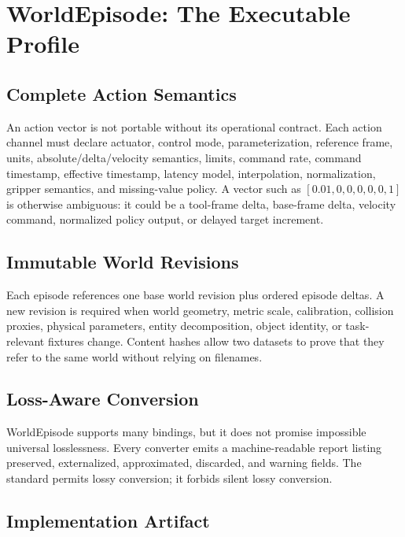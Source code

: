 \section{WorldEpisode: The Executable Profile}
\label{sec:profile}

\subsection{Complete Action Semantics}

An action vector is not portable without its operational contract. Each action channel must declare
actuator, control mode, parameterization, reference frame, units, absolute/delta/velocity semantics,
limits, command rate, command timestamp, effective timestamp, latency model, interpolation,
normalization, gripper semantics, and missing-value policy. A vector such as
\([0.01,0,0,0,0,0,1]\) is otherwise ambiguous: it could be a tool-frame delta, base-frame delta,
velocity command, normalized policy output, or delayed target increment.

\subsection{Immutable World Revisions}

Each episode references one base world revision plus ordered episode deltas. A new revision is
required when world geometry, metric scale, calibration, collision proxies, physical parameters,
entity decomposition, object identity, or task-relevant fixtures change. Content hashes allow two
datasets to prove that they refer to the same world without relying on filenames.

\subsection{Loss-Aware Conversion}

WorldEpisode supports many bindings, but it does not promise impossible universal losslessness.
Every converter emits a machine-readable report listing preserved, externalized, approximated,
discarded, and warning fields. The standard permits lossy conversion; it forbids silent lossy
conversion.

\subsection{Implementation Artifact}


